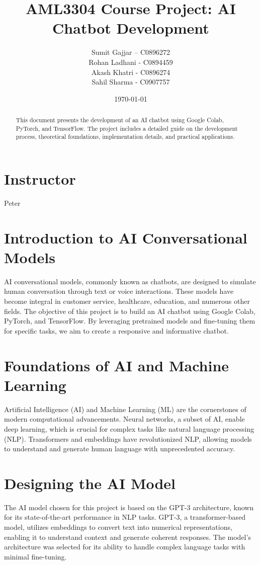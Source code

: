 \documentclass[12pt]{article}
\title{AML3304 Course Project: AI Chatbot Development}
\author{
  Sumit Gajjar – C0896272 \\
  Rohan Ladhani - C0894459 \\
  Akash Khatri - C0896274 \\
  Sahil Sharma - C0907757
}
\date{\today}
\begin{document}
\maketitle

\begin{abstract}
This document presents the development of an AI chatbot using Google Colab, PyTorch, and TensorFlow. The project includes a detailed guide on the development process, theoretical foundations, implementation details, and practical applications.
\end{abstract}

\section*{Instructor}
Peter

\newpage

\tableofcontents
\newpage

\section{Introduction to AI Conversational Models}
AI conversational models, commonly known as chatbots, are designed to simulate human conversation through text or voice interactions. These models have become integral in customer service, healthcare, education, and numerous other fields. The objective of this project is to build an AI chatbot using Google Colab, PyTorch, and TensorFlow. By leveraging pretrained models and fine-tuning them for specific tasks, we aim to create a responsive and informative chatbot.

\section{Foundations of AI and Machine Learning}
Artificial Intelligence (AI) and Machine Learning (ML) are the cornerstones of modern computational advancements. Neural networks, a subset of AI, enable deep learning, which is crucial for complex tasks like natural language processing (NLP). Transformers and embeddings have revolutionized NLP, allowing models to understand and generate human language with unprecedented accuracy.

\section{Designing the AI Model}
The AI model chosen for this project is based on the GPT-3 architecture, known for its state-of-the-art performance in NLP tasks. GPT-3, a transformer-based model, utilizes embeddings to convert text into numerical representations, enabling it to understand context and generate coherent responses. The model's architecture was selected for its ability to handle complex language tasks with minimal fine-tuning.
\end{document}
